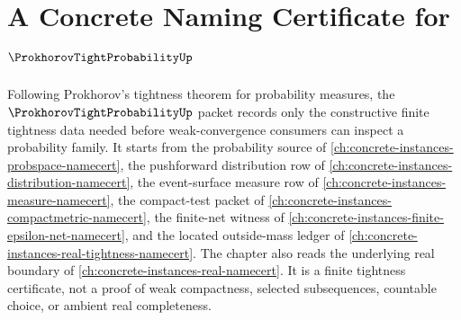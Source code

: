 \chapter{A Concrete Naming Certificate for $\ProkhorovTightProbabilityUp$}
\label{ch:concrete-instances-prokhorov-tight-probability-namecert}

Following Prokhorov's tightness theorem for probability measures, the $\ProkhorovTightProbabilityUp$ packet records only the constructive finite tightness data needed before weak-convergence consumers can inspect a probability family. It starts from the probability source of \autoref{ch:concrete-instances-probspace-namecert}, the pushforward distribution row of \autoref{ch:concrete-instances-distribution-namecert}, the event-surface measure row of \autoref{ch:concrete-instances-measure-namecert}, the compact-test packet of \autoref{ch:concrete-instances-compactmetric-namecert}, the finite-net witness of \autoref{ch:concrete-instances-finite-epsilon-net-namecert}, and the located outside-mass ledger of \autoref{ch:concrete-instances-real-tightness-namecert}. The chapter also reads the underlying real boundary of \autoref{ch:concrete-instances-real-namecert}. It is a finite tightness certificate, not a proof of weak compactness, selected subsequences, countable choice, or ambient real completeness.

